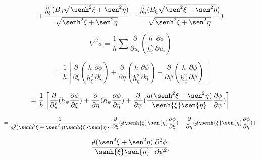 \documentclass[12pt,a4paper]{article}
\begin{document}
\begin{enumerate}
\begin{enumerate}
        \begin{equation*}
            + \frac{\frac{\partial}{\partial \xi}(B_\eta \sqrt{\senh^2{\xi} + \sen^2{\eta}})}{\sqrt{\senh^2{\xi} + \sen^2{\eta}}} - \frac{\frac{\partial}{\partial \eta}(B_\xi \sqrt{\sen^2{\xi} + \sen^2{\eta}})}{\sqrt{\senh^2{\xi} + \sen^2{\eta}}})
        \end{equation*}
        
        
        
        
        
        
        
        \newpage
        
        
        \begin{equation*}
            \nabla^2 \phi = \frac{1}{h} \sum \frac{\partial}{\partial u_i}\left(\frac{h}{h_i ^2}\frac{\partial \phi}{\partial u_i} \right)
        \end{equation*}
        
        \begin{equation*}
            = \frac{1}{h}\left[\frac{\partial}{\partial \xi}(\frac{h}{h_\xi ^2}\frac{\partial \phi}{\partial \xi}) + \frac{\partial}{\partial \eta} (\frac{h}{h_\eta ^2} \frac{\partial \phi}{\partial \eta}) + \frac{\partial}{\partial \psi}(\frac{h}{h_\psi ^2} \frac{\partial \phi}{\partial \psi}) \right]
        \end{equation*}
        
        \begin{equation*}
            = \frac{1}{h} \left[\frac{\partial}{\partial \xi} (h_\psi \frac{\partial \phi}{\partial \xi}) + \frac{\partial}{\partial \eta}(h_\psi \frac{\partial \phi}{\partial \eta}) + \frac{\partial}{\partial \psi}(\frac{a(\senh^2{\xi} + \sen^2{\eta})}{\senh{\xi}\sen{\eta}}\frac{\partial \phi}{\partial \psi}) \right]
        \end{equation*}
        
        \begin{equation*}
            = \frac{1}{a\cancel{^3} (\senh^2{\xi} + \sen^2{\eta})\senh{\xi}\sen{\eta}}[\frac{\partial}{\partial \xi}(\cancel{a} \senh{\xi}\sen{\eta} \frac{\partial \phi}{\partial \xi}) + \frac{\partial}{\partial \eta} (\cancel{a}\senh{\xi} \sen{\eta} \frac{\partial \phi}{\partial \eta}) +
        \end{equation*}
        
        \begin{equation*}
             \frac{\cancel{a}(\sen^2{\xi} +\sen^2{\eta})}{\senh{\xi} \sen{\eta}} \frac{\partial^2 \phi}{\partial \psi^2}]
        \end{equation*}
        

\end{enumerate}
\end{enumerate}
\end{document}
